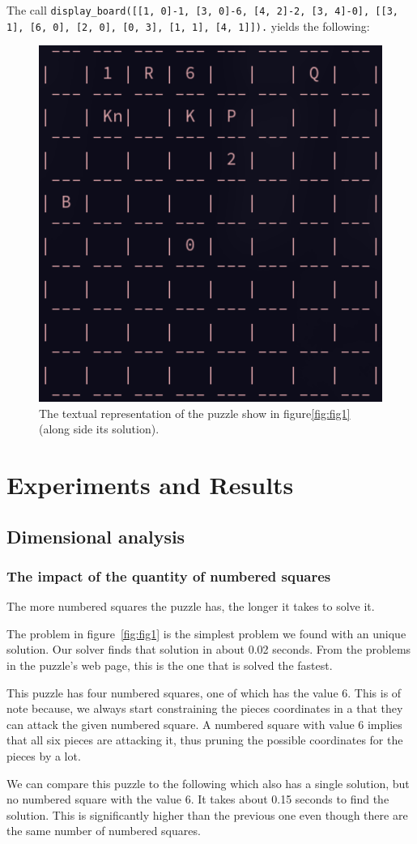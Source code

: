 \documentclass[runningheads]{llncs}
\newcommand{\inlinecode}[1]{\texttt{#1}}
\begin{document}
The call \inlinecode{display\_board([[1, 0]-1, [3, 0]-6, [4, 2]-2, [3, 4]-0],
[[3, 1], [6, 0], [2, 0], [0, 3], [1, 1], [4, 1]]).} yields the following:
\begin{figure}[H]
\includegraphics[width=0.4\linewidth]{figures/display_board_2.png}
  \centering
  \caption{The textual representation of the puzzle show in figure\ref{fig:fig1}
  (along side its solution).}\label{fig:fig3}
\end{figure}

\section{Experiments and Results}
\subsection{Dimensional analysis}
\subsubsection{The impact of the quantity of numbered squares}
The more numbered squares the puzzle has, the longer it takes to solve it.

The problem in figure~\ref{fig:fig1} is the simplest problem we found with
an unique solution. Our solver finds that solution in about 0.02 seconds.
From the problems in the puzzle's web page, this is the one that is solved
the fastest.

This puzzle has four numbered squares, one of which has the value 6. This
is of note because, we always start constraining the pieces coordinates
in a that they can attack the given numbered square. A numbered square with
value 6 implies that all six pieces are attacking it, thus pruning the
possible coordinates for the pieces by a lot.

We can compare this puzzle to the following which also has a single solution,
but no numbered square with the value 6. It takes about 0.15 seconds to
find the solution. This is significantly higher than the previous one
even though there are the same number of numbered squares.
\end{document}
